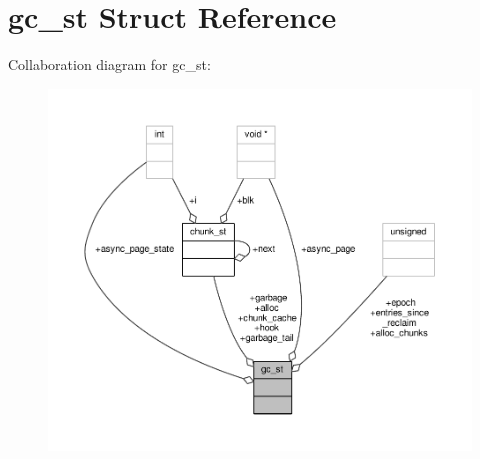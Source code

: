 \hypertarget{structgc__st}{\section{gc\-\_\-st Struct Reference}
\label{structgc__st}
}


Collaboration diagram for gc\-\_\-st\-:
\nopagebreak
\begin{figure}[H]
\begin{center}
\leavevmode
\includegraphics[width=350pt]{structgc__st__coll__graph}
\end{center}
\end{figure}
